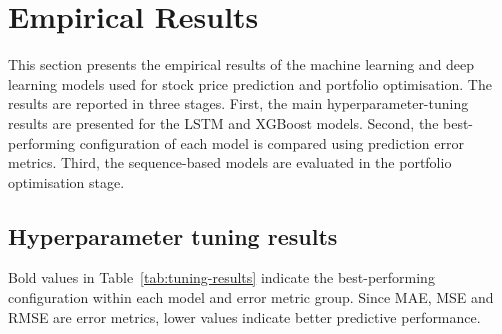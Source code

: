 \section{Empirical Results}

This section presents the empirical results of the machine learning and deep learning models used for stock price prediction and portfolio optimisation. The results are reported in three stages. First, the main hyperparameter-tuning results are presented for the LSTM and XGBoost models. Second, the best-performing configuration of each model is compared using prediction error metrics. Third, the sequence-based models are evaluated in the portfolio optimisation stage.

\subsection{Hyperparameter tuning results}

Bold values in Table~\ref{tab:tuning-results} indicate the best-performing configuration within each model and error metric group. Since MAE, MSE and RMSE are error metrics, lower values indicate better predictive performance.

